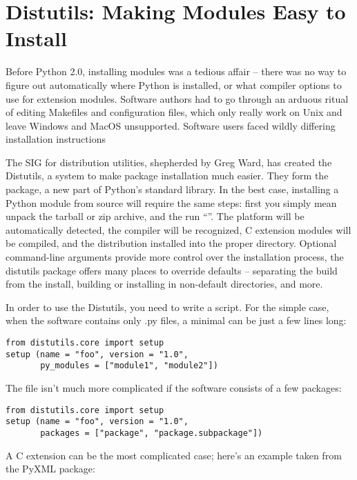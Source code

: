 \documentclass{howto}
\begin{document}
\section{Distutils: Making Modules Easy to Install}

Before Python 2.0, installing modules was a tedious affair -- there
was no way to figure out automatically where Python is installed, or
what compiler options to use for extension modules.  Software authors
had to go through an arduous ritual of editing Makefiles and
configuration files, which only really work on Unix and leave Windows
and MacOS unsupported.  Software users faced wildly differing
installation instructions 

The SIG for distribution utilities, shepherded by Greg Ward, has
created the Distutils, a system to make package installation much
easier.  They form the  package, a new part of
Python's standard library. In the best case, installing a Python
module from source will require the same steps: first you simply mean
unpack the tarball or zip archive, and the run ``''.  The platform will be automatically detected, the compiler
will be recognized, C extension modules will be compiled, and the
distribution installed into the proper directory.  Optional
command-line arguments provide more control over the installation
process, the distutils package offers many places to override defaults
-- separating the build from the install, building or installing in
non-default directories, and more.

In order to use the Distutils, you need to write a 
script.  For the simple case, when the software contains only .py
files, a minimal  can be just a few lines long:

\begin{verbatim}
from distutils.core import setup
setup (name = "foo", version = "1.0", 
       py_modules = ["module1", "module2"])
\end{verbatim}

The  file isn't much more complicated if the software
consists of a few packages:

\begin{verbatim}
from distutils.core import setup
setup (name = "foo", version = "1.0", 
       packages = ["package", "package.subpackage"])
\end{verbatim}

A C extension can be the most complicated case; here's an example taken from 
the PyXML package:
\end{document}
